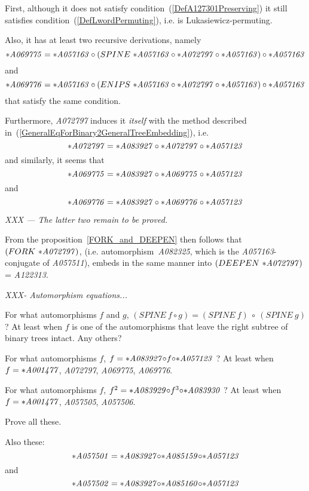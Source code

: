 \documentclass[11pt]{article} %
\newcommand{\eqn}[1]{(\ref{#1})}
\newcommand{\eeq}{\end{equation}}
\newcommand{\beql}[1]{\begin{equation}\label{#1}}
\newcommand{\autname}[1]{{\it *#1}}
\newcommand{\automorphism}[1]{automorphism~\autname{#1}}
\newcommand{\funapply}{\ensuremath{\circ}}
\begin{document}
First, although it does not satisfy condition~\eqn{DefA127301Preserving}
it still satisfies condition~\eqn{DefLwordPermuting}, i.e. is
Lukasiewicz-permuting.

Also, it has at least two recursive derivations, namely
\beql{DefFor_A069775}
\autname{A069775} = \autname{A057163}\funapply(SPINE~\autname{A057163}\funapply\autname{A072797}\funapply\autname{A057163})\funapply\autname{A057163}
\eeq
and
\beql{DefFor_A069776}
\autname{A069776} = \autname{A057163}\funapply(ENIPS~\autname{A057163}\funapply\autname{A072797}\funapply\autname{A057163})\funapply\autname{A057163}
\eeq
that satisfy the same condition.

Furthermore, \autname{A072797} induces it {\em itself}
with the method described in~\eqn{GeneralEqForBinary2GeneralTreeEmbedding},
i.e.
\beql{Selfinduction_for_A072797}
\autname{A072797} = \autname{A083927}\funapply\autname{A072797}\funapply\autname{A057123}
\eeq
and similarly, it seems that
\beql{Selfinduction_for_A069775}
\autname{A069775} = \autname{A083927}\funapply\autname{A069775}\funapply\autname{A057123}
\eeq
and 
\beql{Selfinduction_for_A069775}
\autname{A069776} = \autname{A083927}\funapply\autname{A069776}\funapply\autname{A057123}
\eeq

{\em XXX --- The latter two remain to be proved.}

From the proposition~\ref{FORK_and_DEEPEN} then follows
that $(FORK~\autname{A072797})$, (i.e. \automorphism{A082325},
which is the \autname{A057163}-conjugate of \autname{A057511}),
embeds in the same manner into $(DEEPEN~\autname{A072797})$ = \autname{A122313}.

{\em XXX- Automorphism equations...}


For what automorphisms $f$ and $g$, $(SPINE~f{\funapply}g) = (SPINE~f)~\funapply~(SPINE~g)$  ?
At least when $f$ is one of the automorphisms that leave the right
subtree of binary trees intact. Any others?

For what automorphisms $f$, $f =
\autname{A083927}{\funapply}f{\funapply}\autname{A057123}$ ?
At least when $f=\autname{A001477}$, \autname{A072797},
\autname{A069775}, \autname{A069776}.

For what automorphisms $f$, $f^2 = \autname{A083929}{\funapply}f^3{\funapply}\autname{A083930}$ ?
At least when $f=\autname{A001477}$, \autname{A057505}, \autname{A057506}.

Prove all these.

Also these:
$$
\autname{A057501} = \autname{A083927}{\funapply}\autname{A085159}{\funapply}\autname{A057123}
$$
and
$$
\autname{A057502} = \autname{A083927}{\funapply}\autname{A085160}{\funapply}\autname{A057123}
$$
\end{document}
